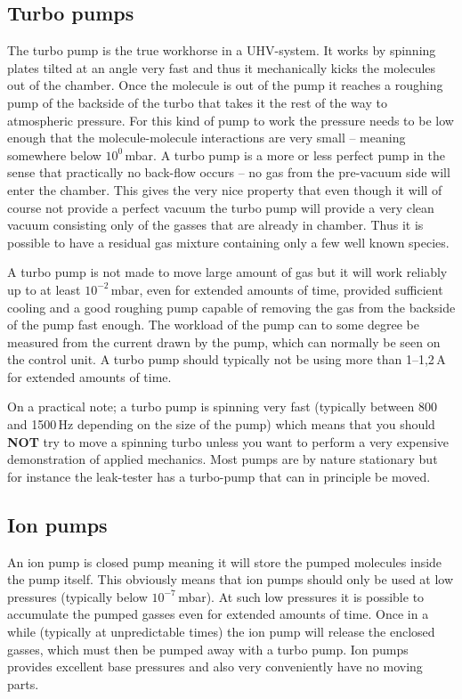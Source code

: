 \documentclass[a4paper,english]{article}
\begin{document}
\subsection{Turbo pumps}
The turbo pump is the true workhorse in a UHV-system. It works by spinning plates tilted at an angle very fast and thus it mechanically kicks the molecules out of the chamber. Once the molecule is out of the pump it reaches a roughing pump of the backside of the turbo that takes it the rest of the way to atmospheric pressure. For this kind of pump to work the pressure needs to be low enough that the molecule-molecule interactions are very small -- meaning somewhere below $10^{0}$\,mbar. A turbo pump is a more or less perfect pump in the sense that practically no back-flow occurs -- no gas from the pre-vacuum side will enter the chamber. This gives the very nice property that even though it will of course not provide a perfect vacuum the turbo pump will provide a very clean vacuum consisting only of the gasses that are already in chamber. Thus it is possible to have a residual gas mixture containing only a few well known species.

A turbo pump is not made to move large amount of gas but it will work reliably up to at least $10^{-2}$\,mbar, even for extended amounts of time, provided sufficient cooling and a good roughing pump capable of removing the gas from the backside of the pump fast enough. The workload of the pump can to some degree be measured from the current drawn by the pump, which can normally be seen on the control unit. A turbo pump should typically not be using more than 1--1,2\,A for extended amounts of time.

On a practical note; a turbo pump is spinning very fast (typically between 800 and 1500\,Hz depending on the size of the pump) which means that you should \textbf{NOT} try to move a spinning turbo unless you want to perform a very expensive demonstration of applied mechanics. Most pumps are by nature stationary but for instance the leak-tester has a turbo-pump that can in principle be moved.

\subsection{Ion pumps}
An ion pump is closed pump meaning it will store the pumped molecules inside the pump itself. This obviously means that ion pumps should only be used at low pressures (typically below $10^{-7}$\,mbar). At such low pressures it is possible to accumulate the pumped gasses even for extended amounts of time. Once in a while (typically at unpredictable times) the ion pump will release the enclosed gasses, which must then be pumped away with a turbo pump. Ion pumps provides excellent base pressures and also very conveniently have no moving parts.
\end{document}
